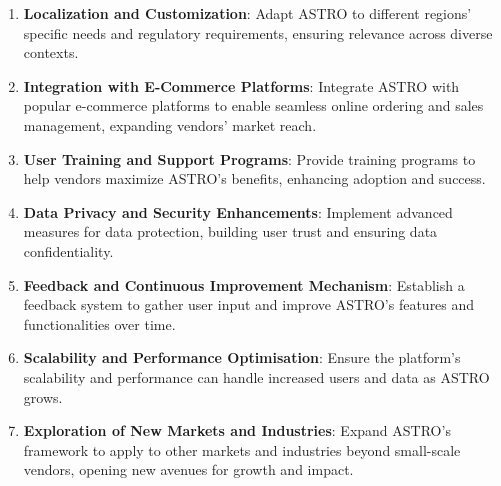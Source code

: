 \begin{enumerate}
    \item \textbf{Localization and Customization}: Adapt ASTRO to different regions' specific needs and regulatory requirements, ensuring relevance across diverse contexts.
    \item \textbf{Integration with E-Commerce Platforms}: Integrate ASTRO with popular e-commerce platforms to enable seamless online ordering and sales management, expanding vendors' market reach.
    \item \textbf{User Training and Support Programs}: Provide training programs to help vendors maximize ASTRO's benefits, enhancing adoption and success.
    \item \textbf{Data Privacy and Security Enhancements}: Implement advanced measures for data protection, building user trust and ensuring data confidentiality.
    \item \textbf{Feedback and Continuous Improvement Mechanism}: Establish a feedback system to gather user input and improve ASTRO's features and functionalities over time.
    \item \textbf{Scalability and Performance Optimisation}: Ensure the platform's scalability and performance can handle increased users and data as ASTRO grows.
    \item \textbf{Exploration of New Markets and Industries}: Expand ASTRO's framework to apply to other markets and industries beyond small-scale vendors, opening new avenues for growth and impact.
\end{enumerate}